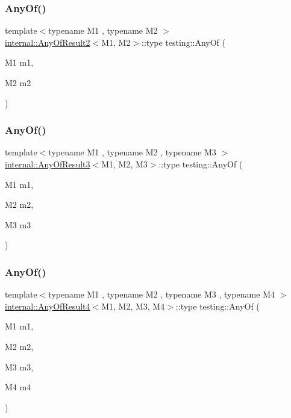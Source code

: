 \subsubsection{\texorpdfstring{AnyOf()}{AnyOf()}\hspace{0.1cm}{\footnotesize\ttfamily [1/9]}}
{\footnotesize\ttfamily template$<$typename M1 , typename M2 $>$ \\
\mbox{\hyperlink{structtesting_1_1internal_1_1_any_of_result2}{internal\+::\+Any\+Of\+Result2}}$<$M1, M2$>$\+::type testing\+::\+Any\+Of (\begin{DoxyParamCaption}\item[{M1}]{m1,  }\item[{M2}]{m2 }\end{DoxyParamCaption})\hspace{0.3cm}{\ttfamily [inline]}}

\mbox{\label{namespacetesting_a3ccbde3ba01189587676d44a4333c0a5}} 
\subsubsection{\texorpdfstring{AnyOf()}{AnyOf()}\hspace{0.1cm}{\footnotesize\ttfamily [2/9]}}
{\footnotesize\ttfamily template$<$typename M1 , typename M2 , typename M3 $>$ \\
\mbox{\hyperlink{structtesting_1_1internal_1_1_any_of_result3}{internal\+::\+Any\+Of\+Result3}}$<$M1, M2, M3$>$\+::type testing\+::\+Any\+Of (\begin{DoxyParamCaption}\item[{M1}]{m1,  }\item[{M2}]{m2,  }\item[{M3}]{m3 }\end{DoxyParamCaption})\hspace{0.3cm}{\ttfamily [inline]}}

\mbox{\label{namespacetesting_a1cfcacf2cf19543b86445e3585d5356f}} 
\subsubsection{\texorpdfstring{AnyOf()}{AnyOf()}\hspace{0.1cm}{\footnotesize\ttfamily [3/9]}}
{\footnotesize\ttfamily template$<$typename M1 , typename M2 , typename M3 , typename M4 $>$ \\
\mbox{\hyperlink{structtesting_1_1internal_1_1_any_of_result4}{internal\+::\+Any\+Of\+Result4}}$<$M1, M2, M3, M4$>$\+::type testing\+::\+Any\+Of (\begin{DoxyParamCaption}\item[{M1}]{m1,  }\item[{M2}]{m2,  }\item[{M3}]{m3,  }\item[{M4}]{m4 }\end{DoxyParamCaption})\hspace{0.3cm}{\ttfamily [inline]}}

